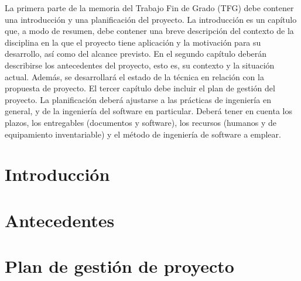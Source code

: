  \null\vfill
    \noindent La primera parte de la memoria del Trabajo Fin de Grado (TFG) debe contener una introducción y una planificación del proyecto. La introducción es un capítulo que, a modo de resumen, debe contener una breve descripción del contexto de la disciplina en la que el proyecto tiene aplicación y la motivación para su desarrollo, así como del alcance previsto. En el segundo capítulo deberán describirse los antecedentes del proyecto, esto es, su contexto y la situación actual. Además, se desarrollará el estado de la técnica en relación con la propuesta de proyecto. El tercer capítulo debe incluir el plan de gestión del proyecto. La planificación deberá ajustarse a las prácticas de ingeniería en general, y de la ingeniería del software en particular. Deberá tener en cuenta los plazos, los entregables (documentos y software), los recursos (humanos y de equipamiento inventariable) y el método de ingeniería de software a emplear.
    \\

\chapter{Introducción}
\label{cap:introduccion}


\newpage{\ }
\cleardoublepage

\chapter{Antecedentes}
\label{cap:background}


\newpage{\ }
\cleardoublepage

\chapter{Plan de gestión de proyecto}
\label{cap:planificación}


